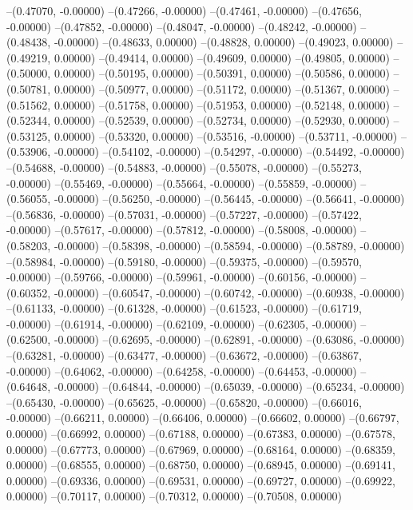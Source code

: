 --(0.47070, -0.00000)
--(0.47266, -0.00000)
--(0.47461, -0.00000)
--(0.47656, -0.00000)
--(0.47852, -0.00000)
--(0.48047, -0.00000)
--(0.48242, -0.00000)
--(0.48438, -0.00000)
--(0.48633, 0.00000)
--(0.48828, 0.00000)
--(0.49023, 0.00000)
--(0.49219, 0.00000)
--(0.49414, 0.00000)
--(0.49609, 0.00000)
--(0.49805, 0.00000)
--(0.50000, 0.00000)
--(0.50195, 0.00000)
--(0.50391, 0.00000)
--(0.50586, 0.00000)
--(0.50781, 0.00000)
--(0.50977, 0.00000)
--(0.51172, 0.00000)
--(0.51367, 0.00000)
--(0.51562, 0.00000)
--(0.51758, 0.00000)
--(0.51953, 0.00000)
--(0.52148, 0.00000)
--(0.52344, 0.00000)
--(0.52539, 0.00000)
--(0.52734, 0.00000)
--(0.52930, 0.00000)
--(0.53125, 0.00000)
--(0.53320, 0.00000)
--(0.53516, -0.00000)
--(0.53711, -0.00000)
--(0.53906, -0.00000)
--(0.54102, -0.00000)
--(0.54297, -0.00000)
--(0.54492, -0.00000)
--(0.54688, -0.00000)
--(0.54883, -0.00000)
--(0.55078, -0.00000)
--(0.55273, -0.00000)
--(0.55469, -0.00000)
--(0.55664, -0.00000)
--(0.55859, -0.00000)
--(0.56055, -0.00000)
--(0.56250, -0.00000)
--(0.56445, -0.00000)
--(0.56641, -0.00000)
--(0.56836, -0.00000)
--(0.57031, -0.00000)
--(0.57227, -0.00000)
--(0.57422, -0.00000)
--(0.57617, -0.00000)
--(0.57812, -0.00000)
--(0.58008, -0.00000)
--(0.58203, -0.00000)
--(0.58398, -0.00000)
--(0.58594, -0.00000)
--(0.58789, -0.00000)
--(0.58984, -0.00000)
--(0.59180, -0.00000)
--(0.59375, -0.00000)
--(0.59570, -0.00000)
--(0.59766, -0.00000)
--(0.59961, -0.00000)
--(0.60156, -0.00000)
--(0.60352, -0.00000)
--(0.60547, -0.00000)
--(0.60742, -0.00000)
--(0.60938, -0.00000)
--(0.61133, -0.00000)
--(0.61328, -0.00000)
--(0.61523, -0.00000)
--(0.61719, -0.00000)
--(0.61914, -0.00000)
--(0.62109, -0.00000)
--(0.62305, -0.00000)
--(0.62500, -0.00000)
--(0.62695, -0.00000)
--(0.62891, -0.00000)
--(0.63086, -0.00000)
--(0.63281, -0.00000)
--(0.63477, -0.00000)
--(0.63672, -0.00000)
--(0.63867, -0.00000)
--(0.64062, -0.00000)
--(0.64258, -0.00000)
--(0.64453, -0.00000)
--(0.64648, -0.00000)
--(0.64844, -0.00000)
--(0.65039, -0.00000)
--(0.65234, -0.00000)
--(0.65430, -0.00000)
--(0.65625, -0.00000)
--(0.65820, -0.00000)
--(0.66016, -0.00000)
--(0.66211, 0.00000)
--(0.66406, 0.00000)
--(0.66602, 0.00000)
--(0.66797, 0.00000)
--(0.66992, 0.00000)
--(0.67188, 0.00000)
--(0.67383, 0.00000)
--(0.67578, 0.00000)
--(0.67773, 0.00000)
--(0.67969, 0.00000)
--(0.68164, 0.00000)
--(0.68359, 0.00000)
--(0.68555, 0.00000)
--(0.68750, 0.00000)
--(0.68945, 0.00000)
--(0.69141, 0.00000)
--(0.69336, 0.00000)
--(0.69531, 0.00000)
--(0.69727, 0.00000)
--(0.69922, 0.00000)
--(0.70117, 0.00000)
--(0.70312, 0.00000)
--(0.70508, 0.00000)
